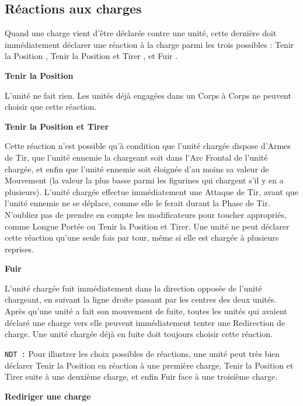 \newpage
\subsection{Réactions aux charges}

Quand une charge vient d'être déclarée contre une unité, cette dernière doit immédiatement déclarer une réaction à la charge parmi les trois possibles : \og Tenir la Position \fg{}, \og Tenir la Position et Tirer \fg{}, et \og Fuir \fg{}.

\noindent\textbf{Tenir la Position}

L'unité ne fait rien. Les unités déjà engagées dans un Corps à Corps ne peuvent choisir que cette réaction.

\noindent\textbf{Tenir la Position et Tirer}

Cette réaction n'est possible qu'à condition que l'unité chargée dispose d'Armes de Tir, que l'unité ennemie la chargeant soit dans l'Arc Frontal de l'unité chargée, et enfin que l'unité ennemie soit éloignée d'au moins sa valeur de Mouvement (la valeur la plus basse parmi les figurines qui chargent s'il y en a plusieurs). L'unité chargée effectue immédiatement une Attaque de Tir, avant que l'unité ennemie ne se déplace, comme elle le ferait durant la Phase de Tir. N'oubliez pas de prendre en compte les modificateurs pour toucher appropriés, comme Longue Portée ou Tenir la Position et Tirer. Une unité ne peut déclarer cette réaction qu'une seule fois par tour, même si elle est chargée à plusieurs reprises.

\noindent\textbf{Fuir}

L'unité chargée fuit immédiatement dans la direction opposée de l'unité chargeant, en suivant la ligne droite passant par les centres des deux unités. Après qu'une unité a fait son mouvement de fuite, toutes les unités qui avaient déclaré une charge vers elle peuvent immédiatement tenter une Redirection de charge. Une unité chargée déjà en fuite doit toujours choisir cette réaction.

\texttt{NDT :} Pour illustrer les choix possibles de réactions, une unité peut très bien déclarer Tenir la Position en réaction à une première charge, Tenir la Position et Tirer suite à une deuxième charge, et enfin Fuir face à une troisième charge.

\noindent\textbf{Rediriger une charge}

